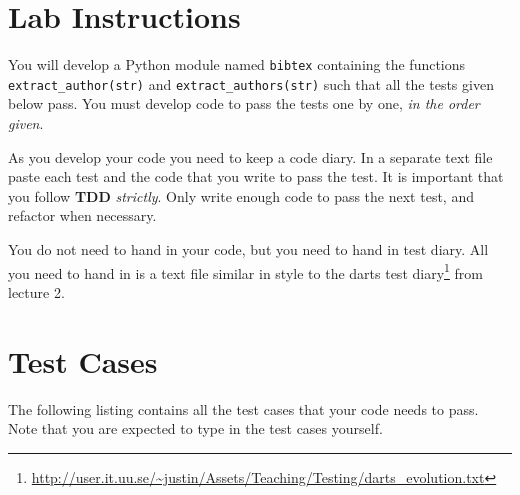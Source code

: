\documentclass[10pt]{paper}
\begin{document}
\section*{Lab Instructions}
You will develop a Python module named \texttt{bibtex} containing the
functions \texttt{extract\_author(str)} and
\texttt{extract\_authors(str)} such that all the tests given below
pass.  You must develop code to pass the tests one by one, \emph{in
  the order given}.

As you develop your code you need to keep a code diary. In a separate
text file paste each test and the code that you write to pass the
test. It is important that you follow \textbf{TDD}
\emph{strictly}. Only write enough code to pass the next test, and
refactor when necessary.

You do not need to hand in your code, but you need to hand in test
diary. All you need to hand in is a text file similar in style to the
darts test
diary\footnote{\url{http://user.it.uu.se/~justin/Assets/Teaching/Testing/darts_evolution.txt}}
from lecture 2.




\section*{Test Cases}
The following listing contains all the test cases that your code needs
to pass. Note that you are expected to type in the test cases
yourself.
\end{document}
